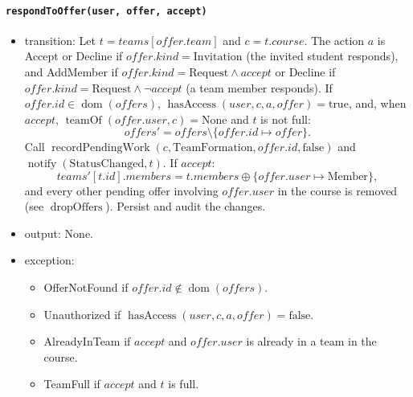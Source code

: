 \documentclass[12pt, titlepage]{article}
\begin{document}
\paragraph{\texttt{respondToOffer(user, offer, accept)}}
\begin{itemize}
    \item transition: Let $t=\mathit{teams}[offer.team]$ and $c=t.course$. The action $a$ is Accept or Decline if $offer.kind=\text{Invitation}$ (the invited student responds), and AddMember if $offer.kind=\text{Request}\land accept$ or Decline if $offer.kind=\text{Request}\land\neg accept$ (a team member responds). If $offer.id\in\operatorname{dom}(\mathit{offers})$, $\operatorname{hasAccess}(user,c,a,offer)=\text{true}$, and, when $accept$, $\operatorname{teamOf}(offer.user,c)=\text{None}$ and $t$ is not full:
    \[
    \mathit{offers}'=\mathit{offers}\setminus\{offer.id\mapsto offer\}.
    \]
    Call $\operatorname{recordPendingWork}(c,\text{TeamFormation},offer.id,\text{false})$ and $\operatorname{notify}(\text{StatusChanged},t)$. If $accept$:
    \[
    \mathit{teams}'[t.id].members=t.members\oplus\{offer.user\mapsto\text{Member}\},
    \]
    and every other pending offer involving $offer.user$ in the course is removed (see $\operatorname{dropOffers}$). Persist and audit the changes.
    \item output: None.
    \item exception:
    \begin{itemize}
        \item OfferNotFound if $offer.id\notin\operatorname{dom}(\mathit{offers})$.
        \item Unauthorized if $\operatorname{hasAccess}(user,c,a,offer)=\text{false}$.
        \item AlreadyInTeam if $accept$ and $offer.user$ is already in a team in the course.
        \item TeamFull if $accept$ and $t$ is full.
    \end{itemize}
\end{itemize}
\end{document}
